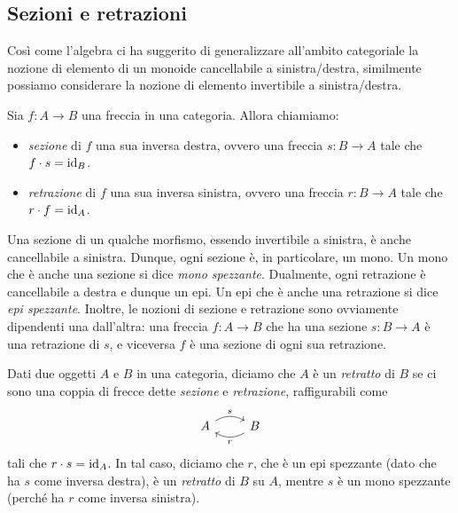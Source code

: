 \subsection{Sezioni e retrazioni}\label{sec_sezretraz}
Così come l'algebra ci ha suggerito di generalizzare all'ambito categoriale la nozione di elemento di un monoide cancellabile a sinistra/destra,
similmente possiamo considerare la nozione di elemento invertibile a sinistra/destra.

\begin{definition}
 Sia \(f \colon A \to B\) una freccia in una categoria.
 Allora chiamiamo:
 \begin{itemize}
  \item \emph{sezione} di \(f\) una sua inversa destra, ovvero una freccia \(s \colon B \to A\) tale che \(f \cdot s = \mathrm{id}_{B}\).
  \item \emph{retrazione} di \(f\) una sua inversa sinistra, ovvero una freccia \(r \colon B \to A\) tale che \(r \cdot f = \mathrm{id}_{A}\).
 \end{itemize}
\end{definition}
\begin{definition}
 Una sezione di un qualche morfismo, essendo invertibile a sinistra, è anche cancellabile a sinistra.
 Dunque, ogni sezione è, in particolare, un mono.
 Un mono che è anche una sezione si dice \emph{mono spezzante}.
 Dualmente, ogni retrazione è cancellabile a destra e dunque un epi.
 Un epi che è anche una retrazione si dice \emph{epi spezzante}.
 Inoltre, le nozioni di sezione e retrazione sono ovviamente dipendenti una dall'altra:
 una freccia \(f \colon A \to B\) che ha una sezione \(s \colon B\to A\) è una retrazione di \(s\),
 e viceversa \(f\) è una sezione di ogni sua retrazione.
\end{definition}
\begin{definition}[Retratto]
 Dati due oggetti \(A\) e \(B\) in una categoria,
 diciamo che \(A\) è un \emph{retratto} di \(B\) se ci sono una coppia di frecce dette \emph{sezione} e \emph{retrazione}, raffigurabili come
 \begin{equation}
  \begin{tikzcd}
   A \ar[r, bend left, "s"] &B \ar[l, bend left, "r"]
  \end{tikzcd}
 \end{equation}
 tali che \(r \cdot s = \mathrm{id}_A\).
 In tal caso, diciamo che \(r\), che è un epi spezzante (dato che ha \(s\) come inversa destra), è un \emph{retratto} di \(B\) su \(A\), mentre \(s\) è un mono spezzante (perché ha \(r\) come inversa sinistra).
\end{definition}
